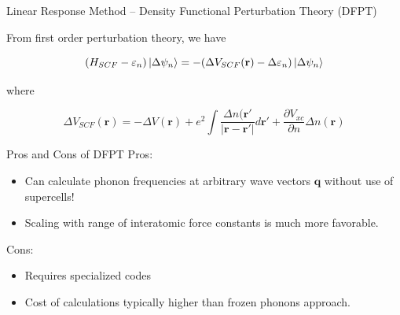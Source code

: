 \documentclass[aspectratio=169]{beamer}
\let \vec \mathbf
\begin{document}
\begin{frame}{Linear Response Method – Density Functional Perturbation Theory (DFPT)}

From first order perturbation theory, we have

\begin{equation*}
(H_{SCF} - \varepsilon_n) \ket{\Delta \psi_n} = -(\Delta V_{SCF}(\vec{r})-\Delta \varepsilon_n) \ket{\Delta \psi_n}
\end{equation*} 

where 

\begin{equation*}
\Delta V_{SCF}(\vec{r}) = -\Delta V(\vec{r}) + e^2 \int \frac{ \Delta n(\vec{r}'}{|\vec{r}-\vec{r'}|} d \vec{r'} + \frac{\partial V_{xc}}{\partial n} \Delta n(\vec{r})
\end{equation*} 

\end{frame} 

\begin{frame}{Pros and Cons of DFPT}
Pros:
\begin{itemize}
    \item Can calculate phonon frequencies at arbitrary wave vectors $\vec{q}$ without use of supercells!
    \item Scaling with range of interatomic force constants is much more favorable.
\end{itemize}

Cons:
\begin{itemize}
    \item Requires specialized codes
    \item Cost of calculations typically higher than frozen phonons approach.
\end{itemize}

\end{frame} 
\end{document}
